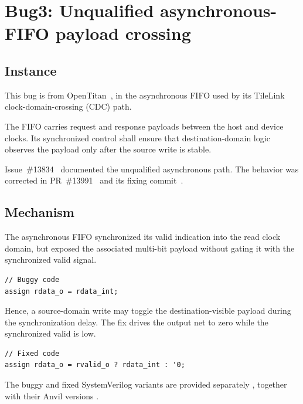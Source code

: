\documentclass[conference]{IEEEtran}
\newcommand{\bugsection}[2]{%
  \refstepcounter{section}%
  \setcounter{subsection}{0}%
  \section*{Bug#1: #2}%
}
\begin{document}

\bugsection{3}{Unqualified asynchronous-FIFO payload crossing}




\subsection{Instance}

This bug is from OpenTitan~\cite{opentitan}, in the asynchronous FIFO used
by its TileLink clock-domain-crossing (CDC) path.

The FIFO carries request and response payloads between the host and
device clocks. Its synchronized control shall ensure that destination-domain
logic observes the payload only after the source write is stable.

Issue~\#13834~\cite{cdc-issue} documented the unqualified asynchronous path.
The behavior was corrected in PR~\#13991~\cite{cdc-fix} and its fixing
commit~\cite{cdc-fix-commit}.




\subsection{Mechanism}

The asynchronous FIFO synchronized its valid indication into the read clock
domain, but exposed the associated multi-bit payload without gating it with
the synchronized valid signal.

\begin{lstlisting}
// Buggy code
assign rdata_o = rdata_int;
\end{lstlisting}

Hence, a source-domain write may toggle the destination-visible payload
during the synchronization delay. The fix drives the output net to zero while
the synchronized valid is low.

\begin{lstlisting}
// Fixed code
assign rdata_o = rvalid_o ? rdata_int : '0;
\end{lstlisting}

The buggy and fixed SystemVerilog variants are provided separately
\cite{bug3-sv-buggy,bug3-sv-fixed}, together with their Anvil versions
\cite{bug3-anvil-buggy,bug3-anvil-fixed}.
\end{document}
